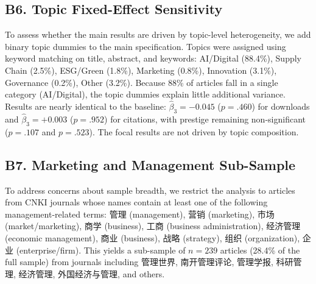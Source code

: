 \documentclass[12pt,a4paper]{article}
\begin{document}
\subsection*{B6. Topic Fixed-Effect Sensitivity}

To assess whether the main results are driven by topic-level
heterogeneity, we add binary topic dummies to the main specification.
Topics were assigned using keyword matching on title, abstract, and
keywords: AI/Digital (88.4\%), Supply Chain (2.5\%),
ESG/Green (1.8\%), Marketing (0.8\%), Innovation (3.1\%),
Governance (0.2\%), Other (3.2\%).
Because 88\% of articles fall in a single category (AI/Digital),
the topic dummies explain little additional variance.
Results are nearly identical to the baseline:
$\hat\beta_3 = -0.045$ ($p = .460$) for downloads and
$\hat\beta_3 = +0.003$ ($p = .952$) for citations,
with prestige remaining non-significant ($p = .107$ and $p = .523$).
The focal results are not driven by topic composition.

\subsection*{B7. Marketing and Management Sub-Sample}

To address concerns about sample breadth, we restrict the analysis
to articles from CNKI journals whose names contain at least one of
the following management-related terms:
管理 (management), 营销 (marketing), 市场 (market/marketing),
商学 (business), 工商 (business administration),
经济管理 (economic management), 商业 (business),
战略 (strategy), 组织 (organization), 企业 (enterprise/firm).
This yields a sub-sample of $n = 239$ articles (28.4\% of the full sample)
from journals including 管理世界, 南开管理评论, 管理学报,
科研管理, 经济管理, 外国经济与管理, and others.
\end{document}
